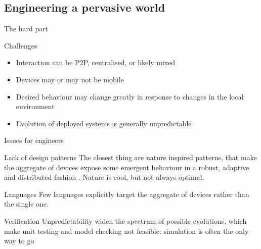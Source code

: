 \documentclass[presentation]{beamer}\mode<presentation>{\usetheme{sapere}}
\begin{document}
\subsection{Engineering a pervasive world}

\begin{frame}{The hard part}
\begin{block}{Challenges}
\begin{itemize}
 \item Interaction can be P2P, centralised, or likely mixed
 \item Devices may or may not be mobile
 \item Desired behaviour may change greatly in response to changes in the local environment
 \item Evolution of deployed systems is generally unpredictable
\end{itemize}
\end{block}
\end{frame}

\begin{frame}{Issues for engineers}
   \begin{block}{Lack of design patterns}
      The closest thing are nature inspired patterns, that make the aggregate of devices expose some emergent behaviour in a robust, adaptive and distributed fashion \cite{ecosystems-jpcc7}. Nature is cool, but not always optimal.
   \end{block}
   \begin{block}{Languages}
      Few languages explicitly target the aggregate of devices rather than the single one.
   \end{block}
   \begin{block}{Verification}
Unpredictability widen the spectrum of possible evolutions, which make unit testing and model checking not feasible: simulation is often the only way to go
   \end{block}
\end{frame}
\end{document}
